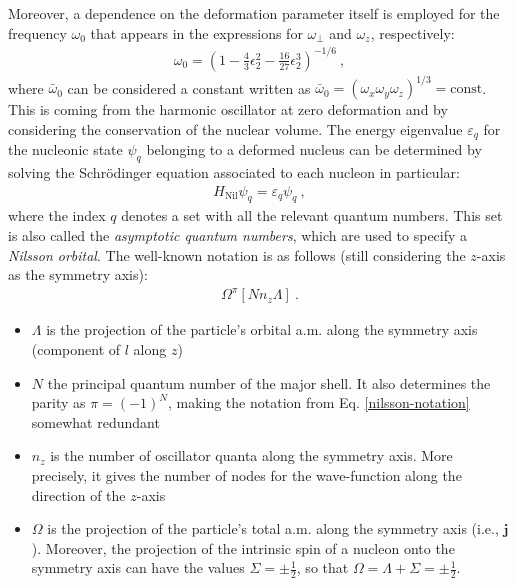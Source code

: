 Moreover, a dependence on the deformation parameter itself is employed for the frequency $\omega_0$ that appears in the expressions for $\omega_\perp$ and $\omega_z$, respectively:
\begin{align}
    \omega_0=\left(1-\frac{4}{3}\epsilon_2^2-\frac{16}{27}\epsilon_2^3\right)^{-1/6}\ ,
    \label{omega-0-oscillator-frequency}
\end{align}
where $\bar{\omega}_0$ can be considered a constant written as $\bar{\omega}_0=(\omega_x\omega_y\omega_z)^{1/3}=\text{const}$. This is coming from the harmonic oscillator at zero deformation and by considering the conservation of the nuclear volume. The energy eigenvalue $\varepsilon_q$ for the nucleonic state $\psi_q$ belonging to a deformed nucleus can be determined by solving the Schrödinger equation associated to each nucleon in particular:
\begin{align}
    H_\text{Nil}\psi_q=\varepsilon_q\psi_q\ ,
    \label{nilsson-schrodiner-equation}
\end{align}
where the index $q$ denotes a set with all the relevant quantum numbers. This set is also called the \emph{asymptotic quantum numbers}, which are used to specify a \emph{Nilsson orbital}. The well-known notation is as follows (still considering the $z$-axis as the symmetry axis):
\begin{align}
    \Omega^\pi\left[Nn_z\Lambda\right]\ .
    \label{nilsson-notation}
\end{align}
\begin{itemize}
    \item $\Lambda$ is the projection of the particle's orbital a.m. along the symmetry axis (component of $l$ along $z$)
    \item $N$ the principal quantum number of the major shell. It also determines the parity as $\pi=(-1)^N$, making the notation from Eq. \eqref{nilsson-notation} somewhat redundant
    \item $n_z$ is the number of oscillator quanta along the symmetry axis. More precisely, it gives the number of nodes for the wave-function along the direction of the $z$-axis
    \item $\Omega$ is the projection of the particle's total a.m. along the symmetry axis (i.e., $\mathbf{j}$). Moreover, the projection of the intrinsic spin of a nucleon onto the symmetry axis can have the values $\Sigma=\pm\frac{1}{2}$, so that $\Omega=\Lambda+\Sigma=\pm\frac{1}{2}$.
\end{itemize}

